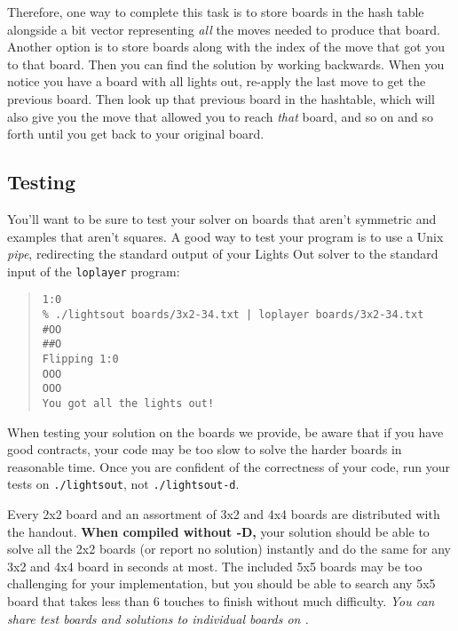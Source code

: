 \documentclass[12pt]{exam}
\begin{document}
Therefore, one way to complete this task is to store boards in the
hash table alongside a bit vector representing \emph{all} the moves
needed to produce that board. Another option is to store boards along
with the index of the move that got you to that board. Then you can
find the solution by working backwards. When you notice you have a
board with all lights out, re-apply the last move to get the previous
board. Then look up that previous board in the hashtable, which will
also give you the move that allowed you to reach \emph{that} board,
and so on and so forth until you get back to your original board.



\subsection{Testing}
\label{sec:testing}

You'll want to be sure to test your solver on boards that aren't
symmetric and examples that aren't squares. A good way to test your
program is to use a Unix \emph{pipe}, redirecting the standard output
of your Lights Out solver to the standard input of the
\lstinline'loplayer' program:

\begin{quote}
\begin{lstlisting}[language={[coin]C}]
% ./lightsout boards/3x2-34.txt
1:0
% ./lightsout boards/3x2-34.txt | loplayer boards/3x2-34.txt
#OO
##O
Flipping 1:0
OOO
OOO
You got all the lights out!
\end{lstlisting}
\end{quote}

When testing your solution on the boards we provide, be aware that if
you have good contracts, your code may be too slow to solve the harder
boards in reasonable time. Once you are confident of the correctness
of your code, run your tests on \lstinline'./lightsout', not
\lstinline'./lightsout-d'.

Every 2x2 board and an assortment of 3x2 and 4x4 boards are
distributed with the handout. \textbf{When compiled without -D,} your
solution should be able to solve all the 2x2 boards (or report no
solution) instantly and do the same for any 3x2 and 4x4 board in
seconds at most. The included 5x5 boards may be too challenging for
your implementation, but you should be able to search any 5x5 board
that takes less than 6 touches to finish without much difficulty.
\emph{You can share test boards and solutions to individual boards on
  \qatool{}.}
\end{document}
